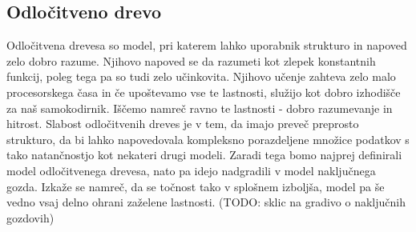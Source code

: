 \documentclass[12pt,a4paper]{article}
\begin{document}

\subsection{Odločitveno drevo}

Odločitvena drevesa so model, pri katerem lahko uporabnik strukturo in napoved zelo dobro razume. 
Njihovo napoved se da razumeti kot zlepek konstantnih funkcij, poleg tega pa so tudi zelo učinkovita. 
Njihovo učenje zahteva zelo malo procesorskega časa in če upoštevamo vse te lastnosti, služijo kot dobro izhodišče za naš samokodirnik. 
Iščemo namreč ravno te lastnosti - dobro razumevanje in hitrost. Slabost odločitvenih dreves je v tem, da imajo preveč preprosto strukturo, 
da bi lahko napovedovala kompleksno porazdeljene množice podatkov s tako natančnostjo kot nekateri drugi modeli. 
Zaradi tega bomo najprej definirali model odločitvenega drevesa, nato pa idejo nadgradili v model naključnega gozda. 
Izkaže se namreč, da se točnost tako v splošnem izboljša, model pa še vedno vsaj delno ohrani zaželene lastnosti. (TODO: sklic na gradivo o naključnih gozdovih)
\end{document}
